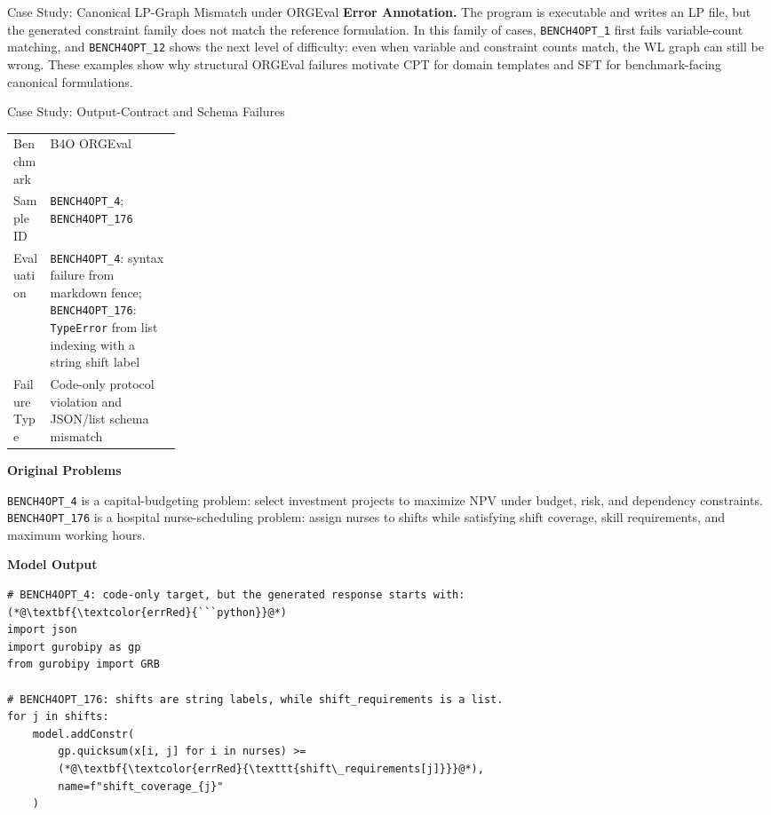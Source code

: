 \begin{casepagestart}{Case Study: Canonical LP-Graph Mismatch under ORGEval}
\vspace{0.3em}
\textbf{Error Annotation.}
The program is executable and writes an LP file, but the generated constraint
family does not match the reference formulation. In this family of cases,
\texttt{BENCH4OPT\_1} first fails variable-count matching, and
\texttt{BENCH4OPT\_12} shows the next level of difficulty: even when variable
and constraint counts match, the WL graph can still be wrong. These examples
show why structural ORGEval failures motivate CPT for domain templates and SFT
for benchmark-facing canonical formulations.

\end{casepagestart}

\begin{casepage}{Case Study: Output-Contract and Schema Failures}

\begin{tabularx}{\linewidth}{@{}p{0.22\linewidth}X@{}}
\toprule
Benchmark & B4O ORGEval \\
Sample ID & \texttt{BENCH4OPT\_4}; \texttt{BENCH4OPT\_176} \\
Evaluation & \texttt{BENCH4OPT\_4}: syntax failure from markdown fence; \texttt{BENCH4OPT\_176}: \texttt{TypeError} from list indexing with a string shift label \\
Failure Type & Code-only protocol violation and JSON/list schema mismatch \\
\bottomrule
\end{tabularx}

\vspace{0.5em}
\textbf{Original Problems}

{\small
\texttt{BENCH4OPT\_4} is a capital-budgeting problem: select investment
projects to maximize NPV under budget, risk, and dependency constraints.
\texttt{BENCH4OPT\_176} is a hospital nurse-scheduling problem: assign nurses
to shifts while satisfying shift coverage, skill requirements, and maximum
working hours.
\par}

\vspace{0.5em}
\textbf{Model Output}

\begin{lstlisting}[style=pythoncase]
# BENCH4OPT_4: code-only target, but the generated response starts with:
(*@\textbf{\textcolor{errRed}{```python}}@*)
import json
import gurobipy as gp
from gurobipy import GRB

# BENCH4OPT_176: shifts are string labels, while shift_requirements is a list.
for j in shifts:
    model.addConstr(
        gp.quicksum(x[i, j] for i in nurses) >=
        (*@\textbf{\textcolor{errRed}{\texttt{shift\_requirements[j]}}}@*),
        name=f"shift_coverage_{j}"
    )
\end{lstlisting}


\end{casepage}
